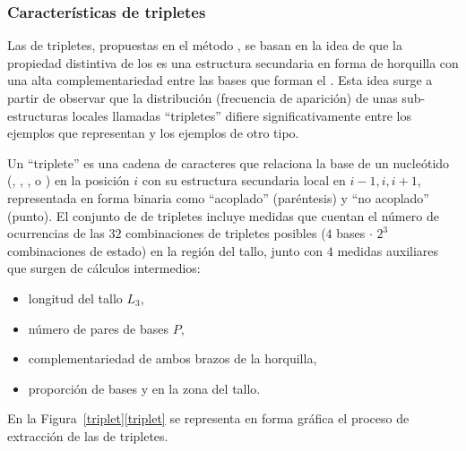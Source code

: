 %
%
%
%
\subsubsection{Características de tripletes}
%
Las  de tripletes, propuestas en el método 
\cite{xue}, se basan en la idea de que la propiedad distintiva de los
 es una estructura secundaria en forma de horquilla
con una alta complementariedad entre las bases que forman el .
Esta idea surge a partir de observar que la distribución
(frecuencia de aparición) de unas sub-estructuras locales llamadas
``tripletes'' difiere significativamente entre los ejemplos que
representan  y los ejemplos de otro tipo.


Un ``triplete'' es una cadena de caracteres que relaciona la base de
un nucleótido (\ntA{}, \ntC{}, \ntG{}, o \ntU{}) en la posición $i$ con su
estructura secundaria local en $i-1,i,i+1$, representada en forma
binaria como ``acoplado'' \pairL{} (paréntesis) y ``no acoplado''
\noPair{} (punto).
El conjunto de  de tripletes incluye medidas que cuentan
el número de ocurrencias de las $32$ combinaciones de tripletes posibles
($4$ bases $\cdot$ $2^3$ combinaciones de estado)
en la región del tallo, junto con $4$ medidas auxiliares que surgen
de cálculos intermedios:
%
\begin{itemize}
\item longitud del tallo $L_3$,
\item número de pares de bases $P$,
\item complementariedad de ambos brazos de la horquilla,
\item proporción de bases \ntG{} y \ntC{} en la zona del tallo.
\end{itemize}
%
En la \iflatexml{}Figura~\ref{triplet}\else\autoref{triplet}\fi{} se
representa en forma gráfica el proceso de extracción de las 
de tripletes.
